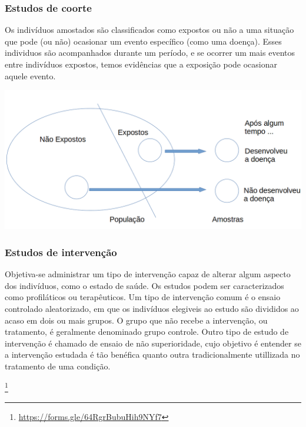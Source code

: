 \documentclass[11pt]{beamer}
\newcommand\blfootnote[1]{%
  \begingroup
  \renewcommand\thefootnote{}\footnote{#1}%
  \addtocounter{footnote}{-1}%
  \endgroup
}
\begin{document}
\begin{frame}
\frametitle{Estudos de coorte}
Os indivíduos amostados são classificados como expostos ou não a uma situação que pode (ou não) ocasionar um evento específico (como uma doença). Esses individuos são acompanhados durante um período, e se ocorrer um mais eventos entre indivíduos expostos, temos evidências que a exposição pode ocasionar aquele evento.
\begin{center}\includegraphics[width=0.8\linewidth]{figs/coorte} \end{center}
\end{frame}

\begin{frame}
\frametitle{Estudos de intervenção}
Objetiva-se administrar um tipo de intervenção capaz de alterar algum aspecto dos indivíduos, como o estado de saúde. Os estudos podem ser caracterizados como profiláticos ou terapêuticos. Um tipo de intervenção comum é o ensaio controlado aleatorizado, em que os indivíduos elegiveis ao estudo são divididos ao acaso em dois ou mais grupos. O grupo que não recebe a intervenção, ou tratamento, é geralmente denominado grupo controle. Outro tipo de estudo de intervenção é chamado de ensaio de não superioridade, cujo objetivo é entender se a intervenção estudada é tão benéfica quanto outra tradicionalmente utillizada no tratamento de uma condição.

\blfootnote{\url{https://forms.gle/64RgrBubuHih9NYf7}}
\end{frame}
\end{document}
